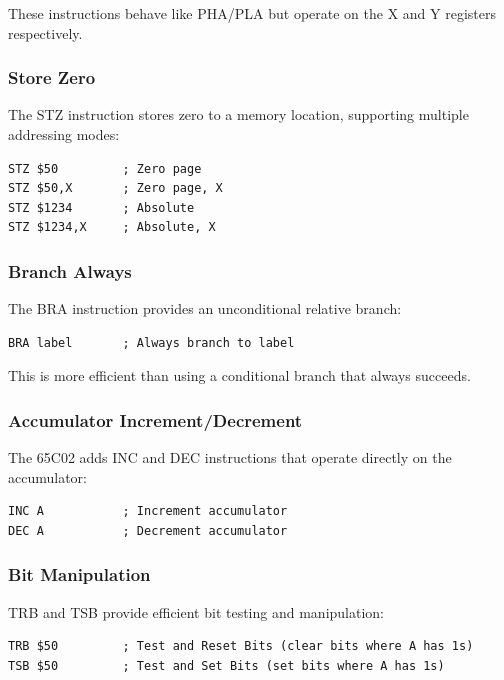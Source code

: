 \documentclass[11pt,letterpaper]{article}
\begin{document}
These instructions behave like PHA/PLA but operate on the X and Y registers respectively.

\subsubsection{Store Zero}

The STZ instruction stores zero to a memory location, supporting multiple addressing modes:

\begin{verbatim}
STZ $50         ; Zero page
STZ $50,X       ; Zero page, X
STZ $1234       ; Absolute
STZ $1234,X     ; Absolute, X
\end{verbatim}

\subsubsection{Branch Always}

The BRA instruction provides an unconditional relative branch:

\begin{verbatim}
BRA label       ; Always branch to label
\end{verbatim}

This is more efficient than using a conditional branch that always succeeds.

\subsubsection{Accumulator Increment/Decrement}

The 65C02 adds INC and DEC instructions that operate directly on the accumulator:

\begin{verbatim}
INC A           ; Increment accumulator
DEC A           ; Decrement accumulator
\end{verbatim}

\subsubsection{Bit Manipulation}

TRB and TSB provide efficient bit testing and manipulation:

\begin{verbatim}
TRB $50         ; Test and Reset Bits (clear bits where A has 1s)
TSB $50         ; Test and Set Bits (set bits where A has 1s)
\end{verbatim}
\end{document}
